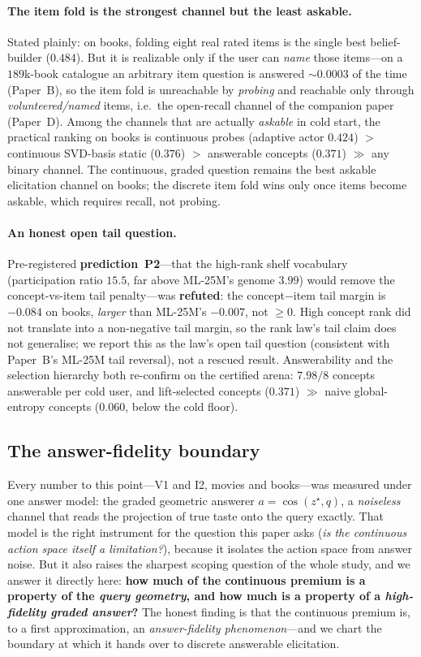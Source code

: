 \documentclass[11pt]{article}
\begin{document}
\paragraph{The item fold is the strongest channel but the least askable.} Stated plainly: on books, folding eight real
rated items is the single best belief-builder ($0.484$). But it is realizable only if the user can \emph{name} those
items---on a $189$k-book catalogue an arbitrary item question is answered $\sim\!0.0003$ of the time (Paper~B), so the
item fold is unreachable by \emph{probing} and reachable only through \emph{volunteered/named} items, i.e.\ the
open-recall channel of the companion paper (Paper~D). Among the channels that are actually \emph{askable} in cold
start, the practical ranking on books is continuous probes (adaptive actor $0.424$) $>$ continuous SVD-basis static
($0.376$) $>$ answerable concepts ($0.371$) $\gg$ any binary channel. The continuous, graded question remains the best
askable elicitation channel on books; the discrete item fold wins only once items become askable, which requires
recall, not probing.

\paragraph{An honest open tail question.} Pre-registered \textbf{prediction~P2}---that the high-rank shelf vocabulary
(participation ratio $15.5$, far above ML-25M's genome $3.99$) would remove the concept-vs-item tail penalty---was
\textbf{refuted}: the concept$-$item tail margin is $-0.084$ on books, \emph{larger} than ML-25M's $-0.007$, not
$\ge0$. High concept rank did not translate into a non-negative tail margin, so the rank law's tail claim does not
generalise; we report this as the law's open tail question (consistent with Paper~B's ML-25M tail reversal), not a
rescued result. Answerability and the selection hierarchy both re-confirm on the certified arena: $7.98/8$ concepts
answerable per cold user, and lift-selected concepts ($0.371$) $\gg$ naive global-entropy concepts ($0.060$, below the
cold floor).

\subsection{The answer-fidelity boundary}\label{sec:i2fidelity}
Every number to this point---V1 and I2, movies and books---was measured under one answer model: the graded geometric
answerer $a=\cos(z^\star,q)$, a \emph{noiseless} channel that reads the projection of true taste onto the query exactly.
That model is the right instrument for the question this paper asks (\emph{is the continuous action space itself a
limitation?}), because it isolates the action space from answer noise. But it also raises the sharpest scoping question
of the whole study, and we answer it directly here: \textbf{how much of the continuous premium is a property of the
\emph{query geometry}, and how much is a property of a \emph{high-fidelity graded answer}?} The honest finding is that the
continuous premium is, to a first approximation, an \emph{answer-fidelity phenomenon}---and we chart the boundary at
which it hands over to discrete answerable elicitation.
\end{document}
